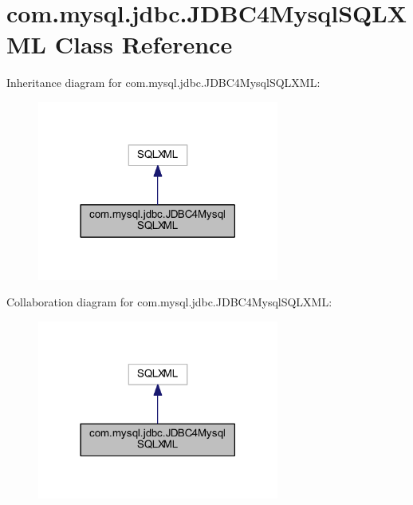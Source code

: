 \hypertarget{classcom_1_1mysql_1_1jdbc_1_1_j_d_b_c4_mysql_s_q_l_x_m_l}{}\section{com.\+mysql.\+jdbc.\+J\+D\+B\+C4\+Mysql\+S\+Q\+L\+X\+ML Class Reference}
\label{classcom_1_1mysql_1_1jdbc_1_1_j_d_b_c4_mysql_s_q_l_x_m_l}


Inheritance diagram for com.\+mysql.\+jdbc.\+J\+D\+B\+C4\+Mysql\+S\+Q\+L\+X\+ML\+:
\nopagebreak
\begin{figure}[H]
\begin{center}
\leavevmode
\includegraphics[width=225pt]{classcom_1_1mysql_1_1jdbc_1_1_j_d_b_c4_mysql_s_q_l_x_m_l__inherit__graph}
\end{center}
\end{figure}


Collaboration diagram for com.\+mysql.\+jdbc.\+J\+D\+B\+C4\+Mysql\+S\+Q\+L\+X\+ML\+:
\nopagebreak
\begin{figure}[H]
\begin{center}
\leavevmode
\includegraphics[width=225pt]{classcom_1_1mysql_1_1jdbc_1_1_j_d_b_c4_mysql_s_q_l_x_m_l__coll__graph}
\end{center}
\end{figure}
